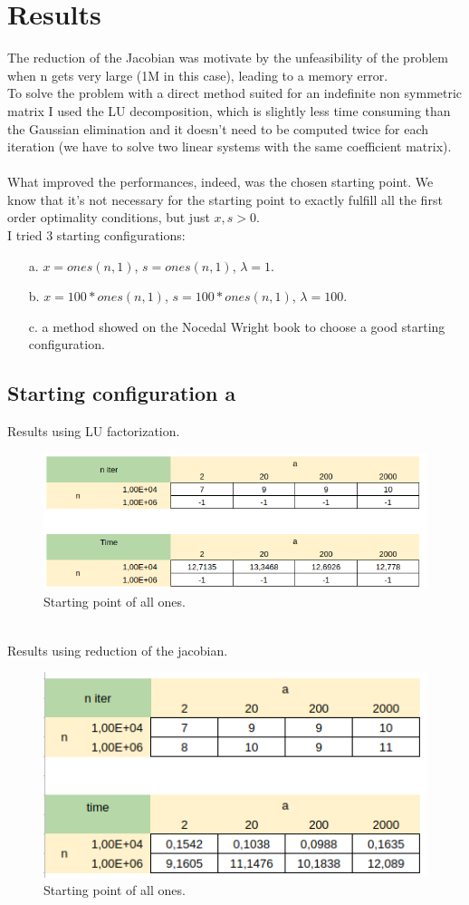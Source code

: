 \documentclass[]{article}
\begin{document}
\section{Results}
The reduction of the Jacobian was motivate by the unfeasibility of the problem when n gets very large (1M in this case), leading to a memory error.\\
To solve the problem with a direct method suited for an indefinite non symmetric matrix I used the LU decomposition, which is slightly less time consuming than the Gaussian elimination and it doesn't need to be computed twice for each iteration (we have to solve two linear systems with the same coefficient matrix).\\\\
What improved the performances, indeed, was the chosen starting point. We know that it's not necessary for the starting point to exactly fulfill all the first order optimality conditions, but just $x, s > 0$.\\
I tried 3 starting configurations:
\begin{enumerate}
	\item [a.]$x=ones(n,1)$, $s=ones(n,1)$, $\lambda = 1$.
	\item [b.]$x=100*ones(n,1)$, $s=100*ones(n,1)$,
	 $\lambda = 100$.
	 \item [c.] a method showed on the Nocedal Wright book to choose a good starting configuration.
\end{enumerate} 
\pagebreak
\subsection{Starting configuration a}
Results using LU factorization.\\
\begin{figure}[h]
	\includegraphics[width=12cm]{table5.png}
	\caption{Starting point of all ones.}
\end{figure}\\
Results using reduction of the jacobian.
\begin{figure}[h]
	\includegraphics[width=12cm]{table2.png}
	\caption{Starting point of all ones.}
\end{figure}
\pagebreak
\end{document}
